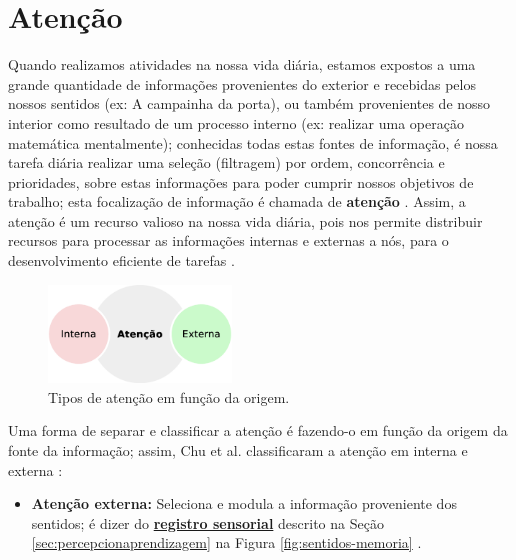 \section{Atenção}
\label{sec:atencao}
Quando realizamos atividades na nossa vida diária, 
estamos expostos a uma grande quantidade de informações  
provenientes do exterior e recebidas pelos nossos sentidos (ex: A campainha da porta),
ou também provenientes de nosso interior como resultado de um processo interno 
(ex: realizar uma operação matemática mentalmente);
conhecidas todas estas fontes de informação,
é nossa tarefa diária realizar uma seleção (filtragem) por ordem, concorrência e prioridades,
sobre estas informações para poder cumprir nossos objetivos de trabalho;
esta focalização de informação é chamada de \textbf{atenção} \cite[pp. 99]{pake2019psicologia}.
Assim, a atenção é um recurso valioso na nossa vida diária, 
pois nos permite distribuir recursos para processar as informações internas e externas
a nós, para o desenvolvimento eficiente de tarefas \cite[pp. 155]{eysenck2017manual}. 

\begin{figure}
  \vspace{-20pt}
  \centering
  \includegraphics[width=0.435\textwidth]{chapters/cap-learning/attention2.eps}
  \vspace{-10pt}
\caption{Tipos de atenção em função da origem.}
\label{fig:attention2}
\end{figure}
Uma forma de separar e classificar  a atenção é fazendo-o
em função da origem da fonte da informação;
assim, Chu et al. classificaram a atenção em interna e externa \cite{ExternalInternalAttention} \cite[pp. 155]{eysenck2017manual}:
\begin{itemize}
\item \textbf{Atenção externa:} 
Seleciona e modula a informação proveniente dos sentidos;
é dizer do \hyperref[sec:percepcionaprendizagem]{\textbf{registro sensorial}}
descrito na Seção \ref{sec:percepcionaprendizagem} na Figura \ref{fig:sentidos-memoria}
\cite{ExternalInternalAttention} \cite[pp. 155]{eysenck2017manual}.
\end{itemize}


